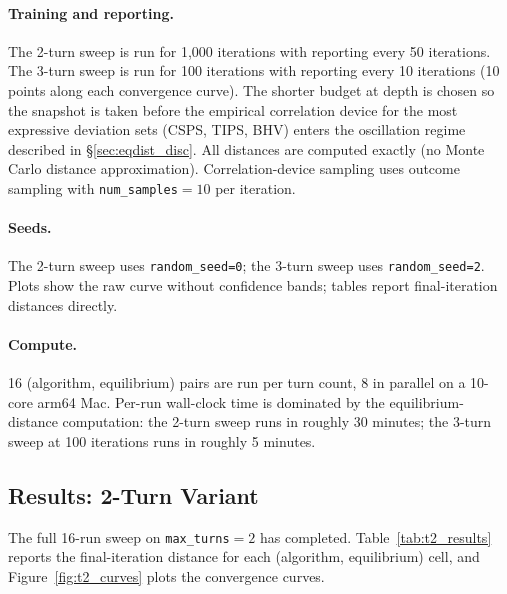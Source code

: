 \documentclass[11pt]{article}
\begin{document}
\paragraph{Training and reporting.} The 2-turn sweep is run for 1{,}000 iterations with reporting every 50 iterations. The 3-turn sweep is run for 100 iterations with reporting every 10 iterations (10 points along each convergence curve). The shorter budget at depth is chosen so the snapshot is taken before the empirical correlation device for the most expressive deviation sets (CSPS, TIPS, BHV) enters the oscillation regime described in \S\ref{sec:eqdist_disc}. All distances are computed exactly (no Monte Carlo distance approximation). Correlation-device sampling uses outcome sampling with \texttt{num\_samples}$=10$ per iteration.

\paragraph{Seeds.} The 2-turn sweep uses \texttt{random\_seed=0}; the 3-turn sweep uses \texttt{random\_seed=2}. Plots show the raw curve without confidence bands; tables report final-iteration distances directly.

\paragraph{Compute.} 16 (algorithm, equilibrium) pairs are run per turn count, 8 in parallel on a 10-core arm64 Mac. Per-run wall-clock time is dominated by the equilibrium-distance computation: the 2-turn sweep runs in roughly 30 minutes; the 3-turn sweep at 100 iterations runs in roughly 5 minutes.

\subsection{Results: 2-Turn Variant}
\label{sec:results_t2}

The full 16-run sweep on \texttt{max\_turns}$=2$ has completed. Table~\ref{tab:t2_results} reports the final-iteration distance for each (algorithm, equilibrium) cell, and Figure~\ref{fig:t2_curves} plots the convergence curves.
\end{document}
